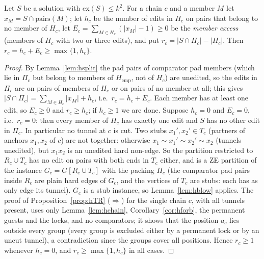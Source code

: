 \begin{lemma}\label{lem:hregion}
Let $S$ be a solution with $\mathrm{ex}(S)\le k^2$. For a chain $c$ and a member $M$ let $x_M=S\cap\mathrm{pairs}(M)$; let $h_c$ be the number of edits in $\Pi_c$ on pairs that belong to no member of $H_c$, let $E_c=\sum_{M\in H_c}(|x_M|-1)\ge0$ be the \emph{member excess} (members of $H_c$ with two or three edits), and put $r_c=|S\cap\Pi_c|-|H_c|$. Then $r_c=h_c+E_c\ge\max\{1,h_c\}$.
\end{lemma}
\begin{proof}
By Lemma~\ref{lem:hsplit} the pad pairs of comparator pad members (which lie in $\Pi_c$ but belong to members of $H_{\mathrm{cmp}}$, not of $H_c$) are unedited, so the edits in $\Pi_c$ are on pairs of members of $H_c$ or on pairs of no member at all; this gives $|S\cap\Pi_c|=\sum_{M\in H_c}|x_M|+h_c$, i.e.\ $r_c=h_c+E_c$. Each member has at least one edit, so $E_c\ge0$ and $r_c\ge h_c$; if $h_c\ge1$ we are done. Suppose $h_c=0$ and $E_c=0$, i.e.\ $r_c=0$: then every member of $H_c$ has exactly one edit and $S$ has no other edit in $\Pi_c$. In particular no tunnel at $c$ is cut. Two stubs $x_1',x_2'\in T_c$ (partners of anchors $x_1,x_2$ of $c$) are not together: otherwise $x_1\sim x_1'\sim x_2'\sim x_2$ (tunnels unedited), but $x_1x_2$ is an unedited hard non-edge. So the partition restricted to $R_c\cup T_c$ has no edit on pairs with both ends in $T_c$ either, and is a ZE partition of the instance $G_c=G[R_c\cup T_c]$ with the packing $H_c$ (the comparator pad pairs inside $R_c$ are plain hard edges of $G_c$, and the vertices of $T_c$ are stubs: each has as only edge its tunnel). $G_c$ is a stub instance, so Lemma~\ref{lem:hblow} applies. The proof of Proposition~\ref{prop:hTR} ($\Rightarrow$) for the single chain $c$, with all tunnels present, uses only Lemma~\ref{lem:hchain}, Corollary~\ref{cor:hforb}, the permanent guests and the locks, and no comparators; it shows that the position $a_c$ lies outside every group (every group is excluded either by a permanent lock or by an uncut tunnel), a contradiction since the groups cover all positions. Hence $r_c\ge1$ whenever $h_c=0$, and $r_c\ge\max\{1,h_c\}$ in all cases.
\end{proof}

